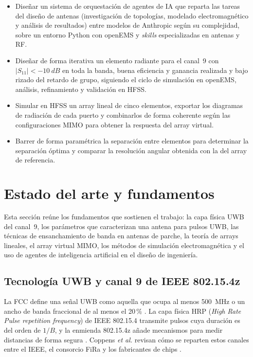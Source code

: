 \documentclass[11pt,a4paper]{article}
\begin{document}
\begin{itemize}
    \item Diseñar un sistema de orquestación de agentes de IA que reparta las tareas del diseño
    de antenas (investigación de topologías, modelado electromagnético y análisis de resultados)
    entre modelos de Anthropic según su complejidad, sobre un entorno Python con openEMS y
    \textit{skills} especializadas en antenas y RF.
    \item Diseñar de forma iterativa un elemento radiante para el canal~9 con
    $|S_{11}| < \SI{-10}{dB}$ en toda la banda, buena eficiencia y ganancia realizada y bajo
    rizado del retardo de grupo, siguiendo el ciclo de simulación en openEMS, análisis,
    refinamiento y validación en HFSS.
    \item Simular en HFSS un array lineal de cinco elementos, exportar los diagramas de radiación de
    cada puerto y combinarlos de forma coherente según las configuraciones MIMO para obtener la
    respuesta del array virtual.
    \item Barrer de forma paramétrica la separación entre elementos para determinar la separación
    óptima y comparar la resolución angular obtenida con la del array de referencia.
\end{itemize}

\section{Estado del arte y fundamentos}\label{sec:estado_del_arte}
Esta sección reúne los fundamentos que sostienen el trabajo: la capa física UWB del canal~9, los
parámetros que caracterizan una antena para pulsos UWB, las técnicas de ensanchamiento de banda en
antenas de parche, la teoría de arrays lineales, el array virtual MIMO, los métodos de simulación
electromagnética y el uso de agentes de inteligencia artificial en el diseño de ingeniería.

\subsection{Tecnología UWB y canal 9 de IEEE 802.15.4z}\label{sec:uwb}
La FCC define una señal UWB como aquella que ocupa al menos \SI{500}{MHz} o un ancho de banda
fraccional de al menos el 20\,\% \cite{fcc2002uwb}. La capa física HRP
(\textit{High Rate Pulse repetition frequency}) de IEEE 802.15.4 transmite pulsos cuya duración es
del orden de $1/B$, y la enmienda 802.15.4z añade mecanismos para medir distancias de forma
segura \cite{ieee802154z2020}. Coppens \textit{et al.} revisan cómo se reparten estos canales
entre el IEEE, el consorcio FiRa y los fabricantes de chips \cite{coppens2022uwb}.
\end{document}
